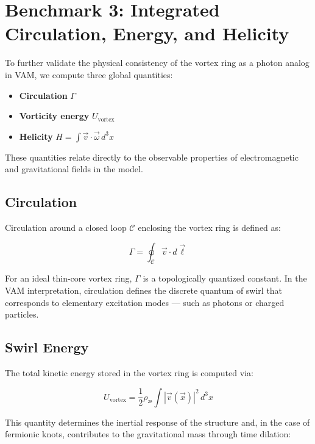\section{Benchmark 3: Integrated Circulation, Energy, and Helicity}

To further validate the physical consistency of the vortex ring as a photon analog in VAM, we compute three global quantities:

\begin{itemize}
    \item \textbf{Circulation} $\Gamma$
    \item \textbf{Vorticity energy} $U_{\text{vortex}}$
    \item \textbf{Helicity} $H = \int \vec{v} \cdot \vec{\omega} \, d^3x$
\end{itemize}

These quantities relate directly to the observable properties of electromagnetic and gravitational fields in the model.

\subsection{Circulation}

Circulation around a closed loop $\mathcal{C}$ enclosing the vortex ring is defined as:

\begin{equation}
\Gamma = \oint_{\mathcal{C}} \vec{v} \cdot d\vec{\ell}
\end{equation}

For an ideal thin-core vortex ring, $\Gamma$ is a topologically quantized constant. In the VAM interpretation, circulation defines the discrete quantum of swirl that corresponds to elementary excitation modes — such as photons or charged particles.

\subsection{Swirl Energy}

The total kinetic energy stored in the vortex ring is computed via:

\begin{equation}
U_{\text{vortex}} = \frac{1}{2} \rho_{\text{\ae}} \int |\vec{v}(\vec{x})|^2 \, d^3x
\end{equation}

This quantity determines the inertial response of the structure and, in the case of fermionic knots, contributes to the gravitational mass through time dilation:


